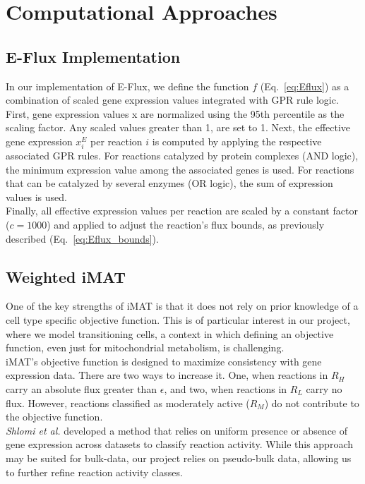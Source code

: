 \chapter{Computational Approaches}
\label{chap:methods_comp}
\section{E-Flux Implementation}

In our implementation of E-Flux, we define the function $f$ (Eq.~\ref{eq:Eflux}) as a combination of scaled gene expression values integrated with GPR rule logic.
\\

First, gene expression values x are normalized using the 95th percentile as the scaling factor. Any scaled values greater than 1, are set to 1. Next, the effective gene  expression $x_i^E$ per reaction $i$ is computed by applying the respective associated GPR rules. For reactions catalyzed by protein complexes (AND logic), the minimum expression value among the associated genes is used. For reactions that can be catalyzed by several enzymes (OR logic), the sum of expression values is used.
\\

Finally, all effective expression values per reaction are scaled by a constant factor ($c=1000$) and applied
to adjust the reaction’s flux bounds, as previously described (Eq.~\ref{eq:Eflux_bounds}).

\section{Weighted iMAT}
One of the key strengths of iMAT is that it does not rely on prior knowledge of a cell type specific objective function. This is of particular interest in our project, where we model transitioning cells, a context in which defining an objective function, even just for mitochondrial metabolism, is challenging. 
\\

iMAT’s objective function is designed to maximize consistency with gene expression data. There are two ways to increase it. One, when reactions in $R_H$ carry an absolute flux greater than
$\epsilon$, and two, when reactions in $R_L$  carry no flux. However, reactions classified as moderately active ($R_M$) do not contribute to the objective function. 
\\

\textit{Shlomi et al.} developed a method that relies on uniform presence or absence of gene expression across datasets to classify reaction activity. While this approach may be suited for bulk-data, our project relies on pseudo-bulk data, allowing us to further refine reaction activity classes. 
\\

